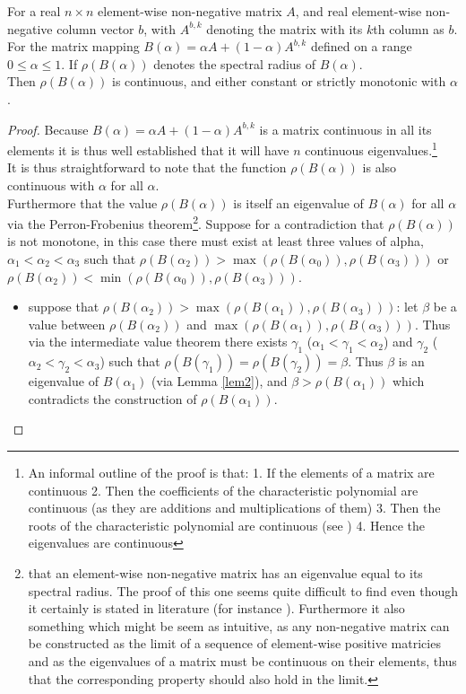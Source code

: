 \begin{Theorem}\label{th:2}
For a real $n\times n$ element-wise non-negative matrix $A$, and real element-wise non-negative column vector $b$, with $A^{b,k}$ denoting the matrix with its $k$th column as $b$.
For the matrix mapping $B(\alpha) = \alpha A + (1-\alpha)A^{b,k}$ defined on a range $0\le\alpha\le1$. If $\rho(B(\alpha))$ denotes the spectral radius of $B(\alpha)$.\\ Then $\rho(B(\alpha))$ is continuous, and either constant or strictly monotonic with $\alpha$.
\end{Theorem}
\begin{proof}
Because $B(\alpha) = \alpha A + (1-\alpha)A^{b,k}$ is a matrix continuous in all its elements it is thus well established that it will have $n$ continuous eigenvalues\cite{matrix1}.\footnote{An informal outline of the proof is that: 1. If the elements of a matrix are continuous 2. Then the coefficients of the characteristic polynomial are continuous (as they are additions and multiplications of them) 3. Then the roots of the characteristic polynomial are continuous (see \cite{roots1}) 4. Hence the eigenvalues are continuous}\\
It is thus straightforward to note that the function $\rho(B(\alpha))$ is also continuous with $\alpha$ for all $\alpha$.\\
Furthermore that the value $\rho(B(\alpha))$ is itself an eigenvalue of $B(\alpha)$ for all $\alpha$ via the Perron-Frobenius theorem\footnote{\label{note1}that an element-wise non-negative matrix has an eigenvalue equal to its spectral radius. The proof of this one seems quite difficult to find even though it certainly is stated in literature (for instance \cite{bo1}). Furthermore it also something which might be seem as intuitive, as any non-negative matrix can be constructed as the limit of a sequence of element-wise positive matricies and as the eigenvalues of a matrix must be continuous on their elements, thus that the corresponding property should also hold in the limit.}.
Suppose for a contradiction that $\rho(B(\alpha))$ is not monotone, in this case there must exist at least three values of alpha, $\alpha_1<\alpha_2<\alpha_3$ such that $\rho(B(\alpha_2))>\max(\rho(B(\alpha_0)),\rho(B(\alpha_3)))$ or $\rho(B(\alpha_2))<\min(\rho(B(\alpha_0)),\rho(B(\alpha_3)))$.
\begin{itemize}[leftmargin=*,labelsep=4mm]
\item	suppose that $\rho(B(\alpha_2))>\max(\rho(B(\alpha_1)),\rho(B(\alpha_3)))$: let $\beta$ be a value between $\rho(B(\alpha_2))$ and $\max(\rho(B(\alpha_1)),\rho(B(\alpha_3)))$. Thus via the intermediate value theorem there exists $\gamma_1$ ($\alpha_1<\gamma_1<\alpha_2$) and $\gamma_2$ ($\alpha_2<\gamma_2<\alpha_3$) such that $\rho(B(\gamma_1))=\rho(B(\gamma_2))=\beta$. Thus $\beta$ is an eigenvalue of $B(\alpha_1)$ (via Lemma \ref{lem2}), and $\beta > \rho(B(\alpha_1))$ which contradicts the construction of $\rho(B(\alpha_1))$.

\end{itemize}
\end{proof}
